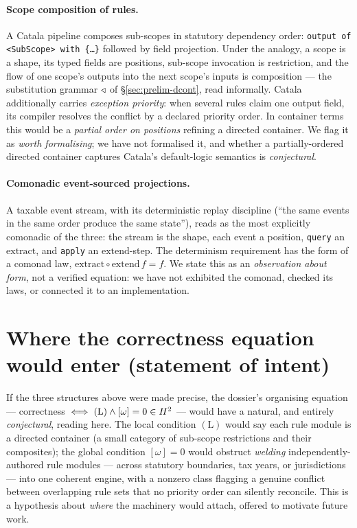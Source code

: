 \paragraph{Scope composition of rules.} A Catala pipeline composes sub-scopes in
statutory dependency order: \texttt{output of <SubScope> with \{\ldots\}}
followed by field projection. Under the analogy, a scope is a shape, its typed
fields are positions, sub-scope invocation is restriction, and the flow of one
scope's outputs into the next scope's inputs is composition --- the substitution
grammar $\triangleleft$ of \S\ref{sec:prelim-dcont}, read informally. Catala additionally
carries \emph{exception priority}: when several rules claim one output field, its
compiler resolves the conflict by a declared priority order. In container terms
this would be a \emph{partial order on positions} refining a directed container.
We flag it as \emph{worth formalising}; we have not formalised it, and whether a
partially-ordered directed container captures Catala's default-logic semantics is
\emph{conjectural}.

\paragraph{Comonadic event-sourced projections.} A taxable event stream, with its
deterministic replay discipline (``the same events in the same order produce the
same state''), reads as the most explicitly comonadic of the three: the stream is
the shape, each event a position, \texttt{query} an $\mathrm{extract}$, and
\texttt{apply} an $\mathrm{extend}$-step. The determinism requirement has the form
of a comonad law, $\mathrm{extract}\circ\mathrm{extend}\,f = f$. We state this as
an \emph{observation about form}, not a verified equation: we have not exhibited
the comonad, checked its laws, or connected it to an implementation.

\section{Where the correctness equation would enter (statement of intent)}\label{sec:tax-intent}

If the three structures above were made precise, the dossier's organising
equation --- correctness $\iff (\mathrm{L})\wedge[\omega]=0\in H^2$ --- would have a
natural, and entirely \emph{conjectural}, reading here. The local condition
$(\mathrm{L})$ would say each rule module is a directed container (a small
category of sub-scope restrictions and their composites); the global condition
$[\omega]=0$ would obstruct \emph{welding} independently-authored rule modules ---
across statutory boundaries, tax years, or jurisdictions --- into one coherent
engine, with a nonzero class flagging a genuine conflict between overlapping
rule sets that no priority order can silently reconcile. This is a hypothesis
about \emph{where} the machinery would attach, offered to motivate future work.

